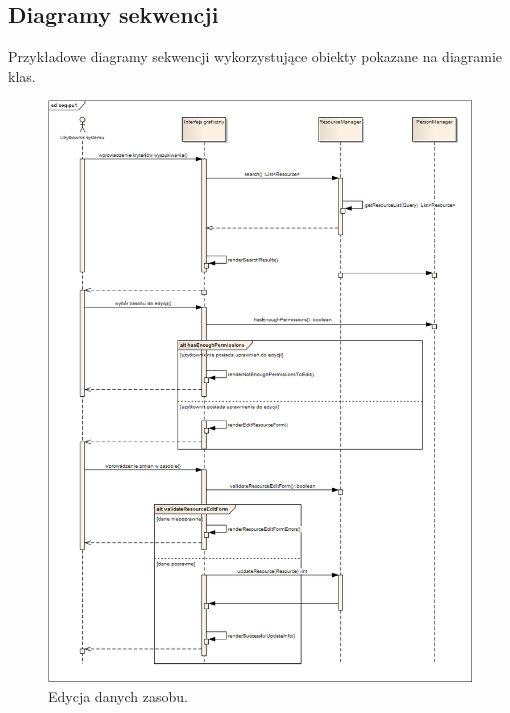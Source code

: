 \newpage
\subsection{Diagramy sekwencji}
Przykładowe diagramy sekwencji wykorzystujące obiekty pokazane na diagramie klas.
\begin{figure}[h!]
	\centering
	\includegraphics[scale=0.4]{img/seq-pu-a}
	\caption{Edycja danych zasobu.\label{fig:seq-pu-a}}
\end{figure}
